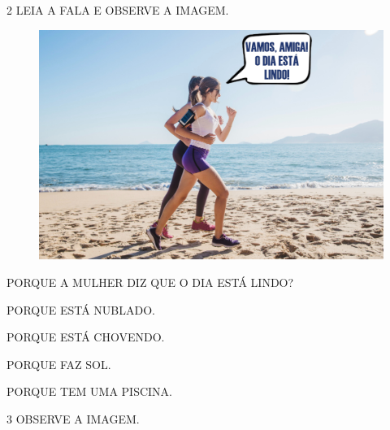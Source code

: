 \pagebreak

\num{2} LEIA A FALA E OBSERVE A IMAGEM.

\begin{figure}[H]
\centering
\includegraphics[width=.8\textwidth]{media/image175a.jpg}
\end{figure}

PORQUE A MULHER DIZ QUE O DIA ESTÁ LINDO? 

\begin{multicols}{2}
\begin{escolha}[itemsep=-5pt]
\item PORQUE ESTÁ NUBLADO.

\item PORQUE ESTÁ CHOVENDO.

\item PORQUE FAZ SOL.

\item  PORQUE TEM UMA PISCINA.
\end{escolha}
\end{multicols}

\num{3} OBSERVE A IMAGEM.

